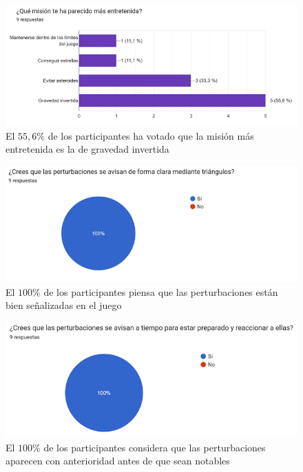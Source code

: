 \begin{figure}[ht!]
	\centering
	\begin{minipage}{0.85\linewidth}
		\centering
		\includegraphics[width=\linewidth]{figs/pregunta6.png}
	\end{minipage}
	\caption[Encuesta de satisfacción. Pregunta 6]{El $55,6\%$ de los participantes ha votado que la misión más entretenida es la de gravedad invertida}
	\label{fig:level3}
\end{figure}

\begin{figure}[ht!]
	\centering
	\begin{minipage}{0.75\linewidth}
		\centering
		\includegraphics[width=\linewidth]{figs/pregunta7.png}
	\end{minipage}
	\caption[Encuesta de satisfacción. Pregunta 7]{El $100\%$ de los participantes piensa que las perturbaciones están bien señalizadas en el juego}
	\label{fig:level1}
\end{figure}

\begin{figure}[ht!]
	\centering
	\begin{minipage}{0.75\linewidth}
		\centering
		\includegraphics[width=\linewidth]{figs/pregunta8.png}
	\end{minipage}
	\caption[Encuesta de satisfacción. Pregunta 8]{El $100\%$ de los participantes considera que las perturbaciones aparecen con anterioridad antes de que sean notables}
	\label{fig:level2}
\end{figure}

